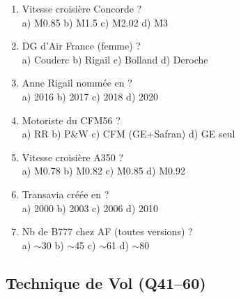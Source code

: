 \begin{enumerate}[nosep, start=21]
\item Vitesse croisière Concorde ? \\ a) M0.85 \quad b) M1.5 \quad c) M2.02 \quad d) M3

\item DG d'Air France (femme) ? \\ a) Couderc \quad b) Rigail \quad c) Bolland \quad d) Deroche

\item Anne Rigail nommée en ? \\ a) 2016 \quad b) 2017 \quad c) 2018 \quad d) 2020

\item Motoriste du CFM56 ? \\ a) RR \quad b) P\&W \quad c) CFM (GE+Safran) \quad d) GE seul

\item Vitesse croisière A350 ? \\ a) M0.78 \quad b) M0.82 \quad c) M0.85 \quad d) M0.92

\item Transavia créée en ? \\ a) 2000 \quad b) 2003 \quad c) 2006 \quad d) 2010

\item Nb de B777 chez AF (toutes versions) ? \\ a) $\sim$30 \quad b) $\sim$45 \quad c) $\sim$61 \quad d) $\sim$80
\end{enumerate}

\subsection*{Technique de Vol (Q41--60)}

